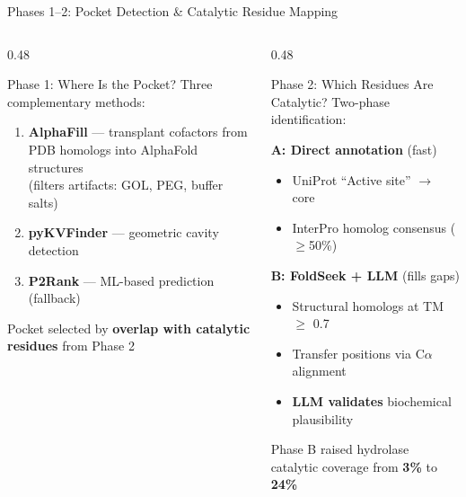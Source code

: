 \documentclass[aspectratio=169, 11pt]{beamer}
\begin{document}
\begin{frame}{Phases 1--2: Pocket Detection \& Catalytic Residue Mapping}
\vspace{-4pt}
\begin{columns}[T]
\begin{column}{0.48\textwidth}
\begin{block}{Phase 1: Where Is the Pocket?}
Three complementary methods:
\begin{enumerate}\small
\item \textbf{AlphaFill} --- transplant cofactors from PDB homologs into AlphaFold structures\\
{\scriptsize (filters artifacts: GOL, PEG, buffer salts)}
\item \textbf{pyKVFinder} --- geometric cavity detection
\item \textbf{P2Rank} --- ML-based prediction (fallback)
\end{enumerate}
\vspace{2pt}
Pocket selected by \textbf{overlap with catalytic residues} from Phase 2
\end{block}
\end{column}

\begin{column}{0.48\textwidth}
\begin{block}{Phase 2: Which Residues Are Catalytic?}
Two-phase identification:

\textbf{A: Direct annotation} (fast)
\begin{itemize}\small
\item UniProt ``Active site'' $\rightarrow$ core
\item InterPro homolog consensus ($\geq$50\%)
\end{itemize}

\textbf{B: FoldSeek + LLM} (fills gaps)
\begin{itemize}\small
\item Structural homologs at TM $\geq$ 0.7
\item Transfer positions via C$\alpha$ alignment
\item \textcolor{accentorange}{\textbf{LLM validates}} biochemical plausibility
\end{itemize}
\end{block}

\vspace{2pt}
\colorbox{accentgreen!15}{\parbox{0.92\textwidth}{\centering\small
Phase B raised hydrolase catalytic coverage from \textbf{3\%} to \textbf{24\%}
}}
\end{column}
\end{columns}
\end{frame}
\end{document}
